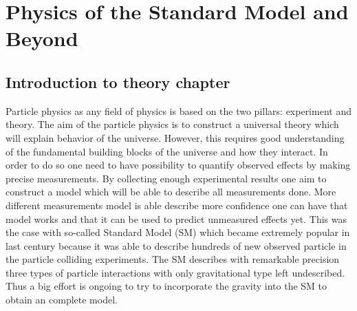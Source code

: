 \chapter{Physics of the Standard Model and Beyond}
\label{chap:Theory}



\section{Introduction to theory chapter}


Particle physics as any field of physics is based on the two pillars: experiment and theory.
The aim of the particle physics is to construct a universal theory which will explain behavior of the universe.
However, this requires good understanding of the fundamental building blocks of the universe and how they interact.
In order to do so one need to have possibility to quantify observed effects by making precise measurements.
By collecting enough experimental results one aim to construct a model which will be able to describe all measurements done.
More different measurements model is able describe more confidence one can have that model works and that it can be used to predict 
unmeasured effects yet. This was the case with so-called Standard Model (SM) which became extremely popular in last century because
it was able to describe hundreds of new observed particle in the particle colliding experiments.
The SM describes with remarkable precision three types of particle interactions with only gravitational type left undescribed.
Thus a big effort is ongoing to try to incorporate the gravity into the SM to obtain an complete model.

